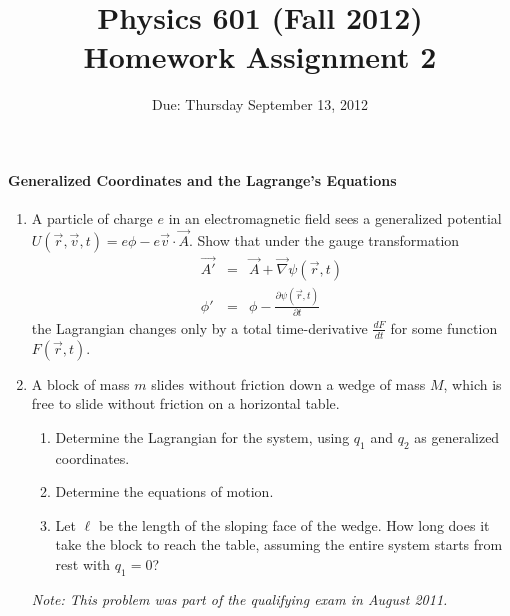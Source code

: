 \documentclass[letterpaper,11pt]{article}
\title{Physics 601 (Fall 2012) \\ Homework Assignment 2}
\date{Due: Thursday September 13, 2012}
\begin{document}
\maketitle

\paragraph*{Generalized Coordinates and the Lagrange's Equations}
\begin{enumerate}
 \item A particle of charge $e$ in an electromagnetic field sees a generalized potential $U(\vec{r},\vec{v},t) = e \phi - e \vec{v} \cdot \vec{A}$.  Show that under the gauge transformation
  \begin{eqnarray*}
   \vec{A'} & = & \vec{A} + \vec{\nabla} \psi(\vec{r},t) \\
   \phi'    & = & \phi - \frac{\partial\psi(\vec{r},t)}{\partial t}
  \end{eqnarray*}
 the Lagrangian changes only by a total time-derivative $\frac{dF}{dt}$ for some function $F(\vec{r},t)$.
 \item A block of mass $m$ slides without friction down a wedge of mass $M$, which is free to slide without friction on a horizontal table.
 \begin{enumerate}
  \item Determine the Lagrangian for the system, using $q_1$ and $q_2$ as generalized coordinates.
  \item Determine the equations of motion.
  \item Let $\ell$ be the length of the sloping face of the wedge.  How long does it take the block to reach the table, assuming the entire system starts from rest with $q_1 = 0$?
 \end{enumerate}
 \textit{Note: This problem was part of the qualifying exam in August 2011.}
 \begin{center}

\end{center}
\end{enumerate}
\end{document}
